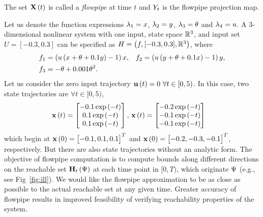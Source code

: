 %
The set $\mathbf{X}\left(t\right)$ is called a 
\emph{flowpipe} at time $t$ and $Y_{t}$ is the flowpipe projection map.
%
\begin{example}\label{eg:ill}
Let us denote the function expressions $\lambda_{1} = x$, $\lambda_{2} = y$,
$\lambda_{3} = \theta$ and $\lambda_{4} = u$.  A $3$-dimensional nonlinear
system with one input, state space $\mathbb{R}^3$, and input set $U =
[-0.3,0.3]$ can be specified as $H = \left(f,[-0.3,0.3],\mathbb{R}^3\right)$, where
%
\begin{align*}
& f_1 = \left( u\left( x + \theta + 0.1y \right) - 1\right)x,
& f_2 = \left( u\left( y + \theta + 0.1x \right) - 1\right)y,\\
& f_3 = -\theta + 0.001\theta^2.
\end{align*}
%
Let us consider the zero input trajectory $\mathbf{u}\left(t\right) = 0~\forall
t\in[0,5)$.  In this case, two state trajectories are $\forall
t\in[0,5)$,
%
\begin{align*}
\mathbf{x}\left(t\right) = \begin{bmatrix} -0.1\exp\left(-t\right)\\ 0.1\exp\left(-t\right)\\ 0.1\exp\left(-t\right) \end{bmatrix},~
& \mathbf{x}\left(t\right) = \begin{bmatrix} -0.2\exp\left(-t\right)\\ -0.1\exp\left(-t\right)\\ -0.1\exp\left(-t\right) \end{bmatrix}
\end{align*}
%
which begin at $\mathbf{x}\left(0\right) = \begin{bmatrix}-0.1,0.1,0.1\end{bmatrix}^T$ and $\mathbf{x}\left(0\right)
= \begin{bmatrix}-0.2,-0.3,-0.1\end{bmatrix}^T$, respectively.
%
But there are also state trajectories without an analytic form.  The
objective of flowpipe computation is to compute bounds along different
directions on the reachable set $\mathbf{H}_{t}\left(\Psi\right)$ at each time
point in $[0,T)$, which originate $\Psi$ (e.g., see Fig~\ref{fig:ill}).
%
We would like the flowpipe approximation to be as close as possible to
the actual reachable set at any given time.  Greater accuracy of flowpipe results in
improved feasibility of verifying reachability properties of the
system.
\end{example}
